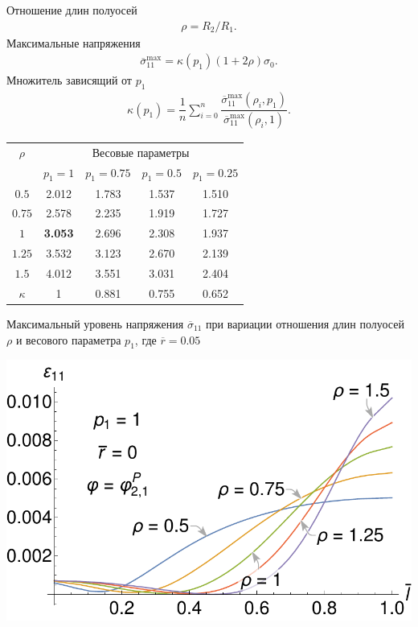\begin{frame}
\begin{minipage}{0.59\textwidth}
	Отношение длин полуосей
	\begin{gather*}
		\rho = R_2 / R_1.
	\end{gather*}
	Максимальные напряжения
	\begin{gather*}
		\overline{\sigma}_{11}^{\max} = \kappa (p_1) \left( 1 + 2 \rho \right) \sigma_0.
	\end{gather*}	
	Множитель зависящий от $p_1$
	\begin{gather*}
		\kappa (p_1) = \dfrac{1}{n} \sum\limits_{i = 0}^{n} \dfrac{\overline{\sigma}_{11}^{\max} (\rho_i, p_1)}{\overline{\sigma}_{11}^{\max} (\rho_i, 1)}.
	\end{gather*}

	\tiny
	\centering
	\begin{tabular}{|c|c|c|c|c|}
		\hline
		          $\rho$  & \multicolumn{4}{c|}{Весовые параметры} \\
		\cline{2-5}
		                  & $p_1 = 1$ & $p_1 = 0.75$ & $p_1 = 0.5$ & $p_1 = 0.25$ \\
		\hline
		$0.5$             & 2.012     & 1.783        & 1.537       & 1.510 \\
		\hline
		$0.75$            & 2.578     & 2.235        & 1.919       & 1.727 \\
		\hline
		$1$               & \textbf{3.053} & 2.696        & 2.308       & 1.937 \\
		\hline
		$1.25$            & 3.532     & 3.123        & 2.670       & 2.139 \\
		\hline
		$1.5$             & 4.012     & 3.551        & 3.031       & 2.404 \\
		\hline
		$\kappa$ & 1         & 0.881        & 0.755       & 0.652 \\
		\hline
	\end{tabular}
	Максимальный уровень напряжения $\overline{\sigma}_{11}$ при вариации отношения длин полуосей $\rho$ и весового параметра $p_1$, где $\overline{r} = 0.05$
\end{minipage}
\begin{minipage}{0.39\textwidth}
	\centering
	\includegraphics[width=\textwidth]{pics/KirshABEps11LocalPresentation.pdf} \\

\end{minipage}
\end{frame}
